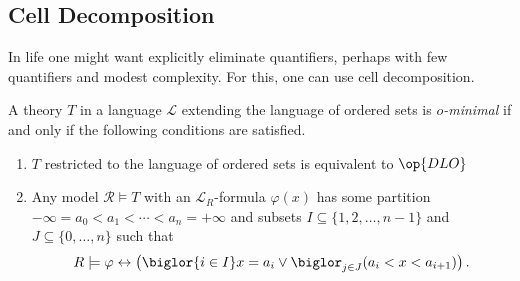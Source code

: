 \documentclass[../notes.tex]{subfiles}
\begin{document}
\subsection{Cell Decomposition}
In life one might want explicitly eliminate quantifiers, perhaps with few quantifiers and modest complexity. For this, one can use cell decomposition.
\begin{defihelper}[$o$-minimal] 
	A theory $T$ in a language $\mathcal L$ extending the language of ordered sets is \textit{$o$-minimal} if and only if the following conditions are satisfied.
	\begin{enumerate}
		\item $T$ restricted to the language of ordered sets is equivalent to $\op{DLO}$
		\item Any model $\mathcal R\models T$ with an $\mathcal L_R$-formula $\varphi(x)$ has some partition $-\infty=a_0<a_1<\cdots<a_n=+\infty$ and subsets $I\subseteq\{1,2,\ldots,n-1\}$ and $J\subseteq\{0,\ldots,n\}$ such that
		\[R\models\varphi\leftrightarrow\left(\biglor{i\in I}x=a_i\lor\biglor_{j\in J}(a_i<x<a_{i+1})\right).\]
	\end{enumerate}
\end{defihelper}
\end{document}
